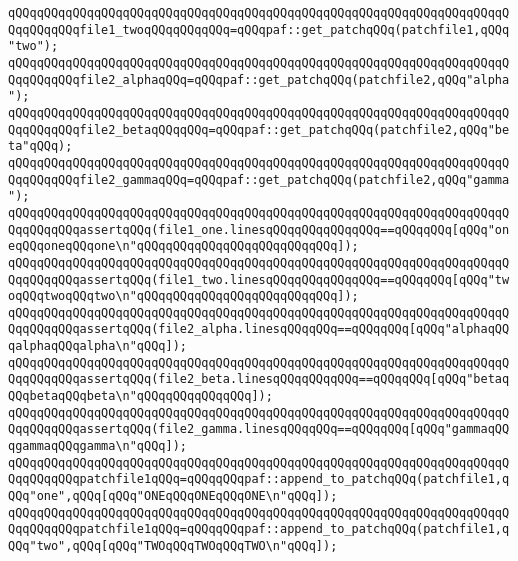 \verb|qQQqqQQqqQQqqQQqqQQqqQQqqQQqqQQqqQQqqQQqqQQqqQQqqQQqqQQqqQQqqQQqqQQqqQQqqQQqqQQqfile1_twoqQQqqQQqqQQq=qQQqpaf::get_patchqQQq(patchfile1,qQQq"two");|\newline
\newline
\verb|qQQqqQQqqQQqqQQqqQQqqQQqqQQqqQQqqQQqqQQqqQQqqQQqqQQqqQQqqQQqqQQqqQQqqQQqqQQqqQQqfile2_alphaqQQq=qQQqpaf::get_patchqQQq(patchfile2,qQQq"alpha");|\newline
\verb|qQQqqQQqqQQqqQQqqQQqqQQqqQQqqQQqqQQqqQQqqQQqqQQqqQQqqQQqqQQqqQQqqQQqqQQqqQQqqQQqfile2_betaqQQqqQQq=qQQqpaf::get_patchqQQq(patchfile2,qQQq"beta"qQQq);|\newline
\verb|qQQqqQQqqQQqqQQqqQQqqQQqqQQqqQQqqQQqqQQqqQQqqQQqqQQqqQQqqQQqqQQqqQQqqQQqqQQqqQQqfile2_gammaqQQq=qQQqpaf::get_patchqQQq(patchfile2,qQQq"gamma");|\newline
\newline
\verb|qQQqqQQqqQQqqQQqqQQqqQQqqQQqqQQqqQQqqQQqqQQqqQQqqQQqqQQqqQQqqQQqqQQqqQQqqQQqqQQqassertqQQq(file1_one.linesqQQqqQQqqQQqqQQq==qQQqqQQq[qQQq"oneqQQqoneqQQqone\n"qQQqqQQqqQQqqQQqqQQqqQQqqQQq]);|\newline
\verb|qQQqqQQqqQQqqQQqqQQqqQQqqQQqqQQqqQQqqQQqqQQqqQQqqQQqqQQqqQQqqQQqqQQqqQQqqQQqqQQqassertqQQq(file1_two.linesqQQqqQQqqQQqqQQq==qQQqqQQq[qQQq"twoqQQqtwoqQQqtwo\n"qQQqqQQqqQQqqQQqqQQqqQQqqQQq]);|\newline
\newline
\verb|qQQqqQQqqQQqqQQqqQQqqQQqqQQqqQQqqQQqqQQqqQQqqQQqqQQqqQQqqQQqqQQqqQQqqQQqqQQqqQQqassertqQQq(file2_alpha.linesqQQqqQQq==qQQqqQQq[qQQq"alphaqQQqalphaqQQqalpha\n"qQQq]);|\newline
\verb|qQQqqQQqqQQqqQQqqQQqqQQqqQQqqQQqqQQqqQQqqQQqqQQqqQQqqQQqqQQqqQQqqQQqqQQqqQQqqQQqassertqQQq(file2_beta.linesqQQqqQQqqQQq==qQQqqQQq[qQQq"betaqQQqbetaqQQqbeta\n"qQQqqQQqqQQqqQQq]);|\newline
\verb|qQQqqQQqqQQqqQQqqQQqqQQqqQQqqQQqqQQqqQQqqQQqqQQqqQQqqQQqqQQqqQQqqQQqqQQqqQQqqQQqassertqQQq(file2_gamma.linesqQQqqQQq==qQQqqQQq[qQQq"gammaqQQqgammaqQQqgamma\n"qQQq]);|\newline
\newline
\newline
\verb|qQQqqQQqqQQqqQQqqQQqqQQqqQQqqQQqqQQqqQQqqQQqqQQqqQQqqQQqqQQqqQQqqQQqqQQqqQQqqQQqpatchfile1qQQq=qQQqqQQqpaf::append_to_patchqQQq(patchfile1,qQQq"one",qQQq[qQQq"ONEqQQqONEqQQqONE\n"qQQq]);|\newline
\verb|qQQqqQQqqQQqqQQqqQQqqQQqqQQqqQQqqQQqqQQqqQQqqQQqqQQqqQQqqQQqqQQqqQQqqQQqqQQqqQQqpatchfile1qQQq=qQQqqQQqpaf::append_to_patchqQQq(patchfile1,qQQq"two",qQQq[qQQq"TWOqQQqTWOqQQqTWO\n"qQQq]);|\newline
